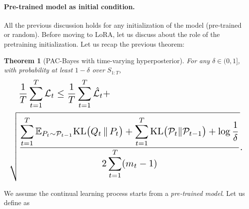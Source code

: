 \documentclass{article}
\theoremstyle{plain}
\newtheorem{theorem}{Theorem}[section]
\theoremstyle{definition}
\theoremstyle{remark}
\begin{document}
\paragraph{Pre-trained model as initial condition.}
All the previous discussion holds for any initialization of the model (pre-trained or random). Before moving to LoRA, let us discuss about the role of the pretraining initialization. Let us recap the previous theorem:
\begin{theorem}[PAC-Bayes with time-varying hyperposterior]
For any $\delta\in(0,1]$, with probability at least $1-\delta$ over $S_{1:T}$,
\begin{equation*}
\resizebox{\linewidth}{!}{$
\begin{aligned} 
&\quad\frac{1}{T} \sum_{t=1}^T \mathcal L_t
\le  
\frac{1}{T} \sum_{t=1}^T \hat{\mathcal L}_t  + \\
&
\sqrt{
\frac{
\displaystyle
\sum_{t=1}^T
\mathbb E_{P_t\sim\mathcal P_{t-1}}
\mathrm{KL}\bigl(Q_t \,\Vert\, P_t\bigr)
+
\sum_{t=1}^T
\mathrm{KL}\bigl(\mathcal P_t\Vert\mathcal P_{t-1}\bigr)
+
\log\frac{1}{\delta}}
{2\displaystyle\sum_{t=1}^T (m_t - 1)}
}.
\end{aligned}
$}
\end{equation*}
\end{theorem}


We assume the continual learning process starts from a \textit{pre-trained model}. Let us define as
\end{document}

